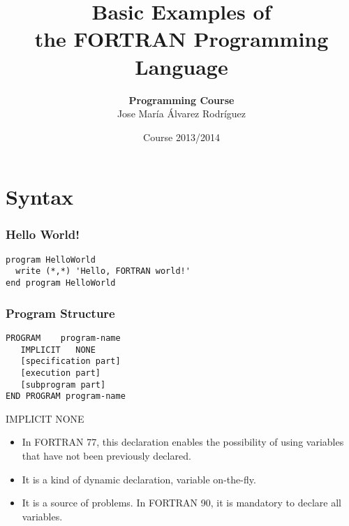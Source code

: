 \documentclass[xcolor=dvipsnames,dvip,notes=show,table]{beamer}
\title[FORTRAN]{Basic Examples of \\ the FORTRAN Programming Language}
\author[Jose María Álvarez Rodríguez]{\textbf{Programming Course} \\ \vspace{0.3cm} Jose María Álvarez Rodríguez}
\subtitle{}
\institute{Department of Computer Science \\ Carlos III University of Madrid}
\date{Course 2013/2014}
\begin{document}
\frame{
\titlepage

}
% 
\frame{
\tableofcontents

}
% 
% 
\section{Syntax}
\begin{frame}[fragile]
\frametitle{Hello World!}

\begin{lstlisting}
program HelloWorld
  write (*,*) 'Hello, FORTRAN world!' 
end program HelloWorld
\end{lstlisting}
\end{frame}


% 
\begin{frame}[fragile]
\frametitle{Program Structure}

\begin{lstlisting}
PROGRAM    program-name
   IMPLICIT   NONE 
   [specification part]
   [execution part]
   [subprogram part]
END PROGRAM program-name
\end{lstlisting}

\begin{alertblock}{IMPLICIT NONE}
\begin{itemize}
 \item In FORTRAN 77, this declaration enables the possibility of using variables that have not been previously declared.
 \item  It is a kind of dynamic declaration, variable on-the-fly.
 \item It is a source of problems. In FORTRAN 90, it is mandatory to declare all variables.
\end{itemize}
\end{alertblock}

\end{frame}
\end{document}
